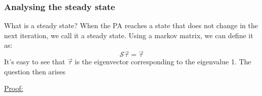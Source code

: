 \documentclass{beamer}
\begin{document}
\begin{frame}[t]\frametitle{Analysing the steady state}

What is a steady state? When the PA reaches a state that does not change in the 
next iteration, we call it a steady state. Using a markov matrix, we can define 
it as:
$$\mathcal{S}\vec{\tau} = \vec{\tau}$$
It's easy to see that $\vec{\tau}$ is the eigenvector corresponding to the eigenvalue
1. The question then arises 


\underline{Proof:} 

\end{frame}
\end{document}
